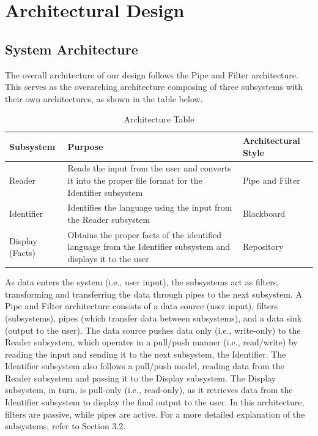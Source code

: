 \section{Architectural Design }
\label{sec:architectural_design}

\subsection{System Architecture}
\label{sub:system_architecture}
The overall architecture of our design follows the Pipe and Filter architecture. This serves as the overarching architecture composing of three subsystems with their own architectures, as shown in the table below.

\begin{table}[h]
    \centering
    \begin{tabularx}{\linewidth}{|X|X|X|}
        \hline
        Subsystem & Purpose & Architectural Style \\ \hline
        Reader & 
        Reads the input from the user and converts it into the
        proper file format for the 
        Identifier subsystem
        & Pipe and Filter \\ \hline
        Identifier
        &
        Identifies the language 
        using the input from the 
        Reader subsystem
        &
        Blackboard \\ \hline
        \centering Display (Facts) 
        & 
        Obtains the proper facts of 
        the identified language from 
        the Identifier subsystem 
        and displays it to the user
        & 
        Repository \\ \hline
        
    \end{tabularx}
    \caption{Architecture Table}
    \label{tab:architecture_table}
\end{table}

As data enters the system (i.e., user input), the subsystems act as filters, transforming and transferring the data through pipes to the next subsystem. A Pipe and Filter architecture consists of a data source (user input), filters (subsystems), pipes (which transfer data between subsystems), and a data sink (output to the user).
The data source pushes data only (i.e., write-only) to the Reader subsystem, which operates in a pull/push manner (i.e., read/write) by reading the input and sending it to the next subsystem, the Identifier. The Identifier subsystem also follows a pull/push model, reading data from the Reader subsystem and passing it to the Display subsystem. The Display subsystem, in turn, is pull-only (i.e., read-only), as it retrieves data from the Identifier subsystem to display the final output to the user.
In this architecture, filters are passive, while pipes are active. For a more detailed explanation of the subsystems, refer to Section 3.2.


